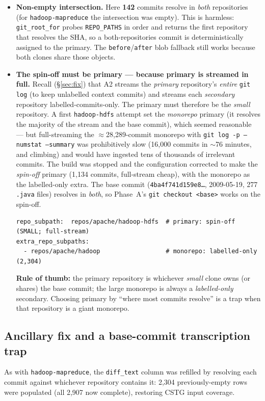 \documentclass[11pt]{article}
\newcommand{\code}[1]{\texttt{#1}}
\begin{document}
\begin{itemize}
  \item \textbf{Non-empty intersection.} Here \textbf{142} commits resolve in
  \emph{both} repositories (for \code{hadoop-mapreduce} the intersection was
  empty). This is harmless: \code{git\_root\_for} probes \code{REPO\_PATHS} in
  order and returns the first repository that resolves the SHA, so a
  both-repositories commit is deterministically assigned to the primary. The
  \code{before}/\code{after} blob fallback still works because both clones share
  those objects.

  \item \textbf{The spin-off must be primary --- because primary is streamed in
  full.} Recall (\S\ref{sec:fix}) that A2 streams the \emph{primary} repository's
  \emph{entire} \code{git log} (to keep unlabelled context commits) and streams
  each \emph{secondary} repository labelled-commits-only. The primary must
  therefore be the \emph{small} repository. A first \code{hadoop-hdfs} attempt
  set the \emph{monorepo} primary (it resolves the majority of the stream and the
  base commit), which seemed reasonable --- but full-streaming the
  $\approx$28{,}289-commit monorepo with \code{git log -p --numstat --summary} was
  prohibitively slow (16{,}000 commits in $\sim$76 minutes, and climbing) and
  would have ingested tens of thousands of irrelevant commits. The build was
  stopped and the configuration corrected to make the \emph{spin-off} primary
  (1{,}134 commits, full-stream cheap), with the monorepo as the labelled-only
  extra. The base commit (\code{4ba4f741d159e8\ldots}, 2009-05-19, 277 \code{.java}
  files) resolves in \emph{both}, so Phase~A's \code{git checkout <base>} works on
  the spin-off.
  \begin{lstlisting}
repo_subpath:  repos/apache/hadoop-hdfs  # primary: spin-off (SMALL; full-stream)
extra_repo_subpaths:
  - repos/apache/hadoop                  # monorepo: labelled-only (2,304)
  \end{lstlisting}
  \textbf{Rule of thumb:} the primary repository is whichever \emph{small} clone
  owns (or shares) the base commit; the large monorepo is always a
  \emph{labelled-only} secondary. Choosing primary by ``where most commits
  resolve'' is a trap when that repository is a giant monorepo.
\end{itemize}

\subsection{Ancillary fix and a base-commit transcription trap}
As with \code{hadoop-mapreduce}, the \code{diff\_text} column was refilled by
resolving each commit against whichever repository contains it: 2{,}304
previously-empty rows were populated (all 2{,}907 now complete), restoring CSTG
input coverage.
\end{document}
